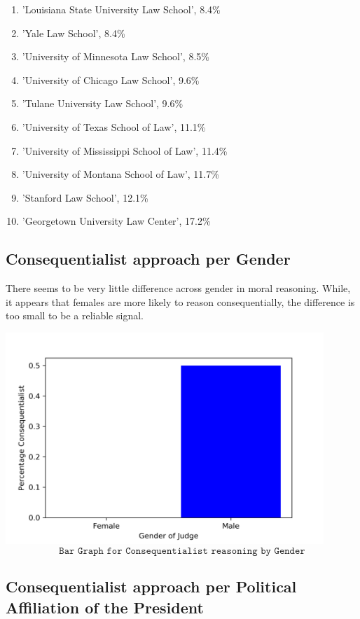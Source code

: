 \documentclass{article}
\begin{document}
\begin{enumerate}
    \item 'Louisiana State University Law School', 8.4\%
    \item 'Yale Law School', 8.4\%
    \item 'University of Minnesota Law School', 8.5\%
    \item 'University of Chicago Law School', 9.6\%
    \item 'Tulane University Law School', 9.6\%
    \item 'University of Texas School of Law', 11.1\%
    \item 'University of Mississippi School of Law', 11.4\%
    \item 'University of Montana School of Law', 11.7\%
    \item 'Stanford Law School', 12.1\%
    \item 'Georgetown University Law Center', 17.2\%
\end{enumerate}

\subsection{Consequentialist approach per Gender}

There seems to be very little difference across gender in moral reasoning. While, it appears that females are more likely to reason consequentially, the difference is too small to be a reliable signal.

\begin{center}
\includegraphics[width = 12cm, height = 8cm]{genderbar.png}
    \[\texttt{Bar Graph for Consequentialist reasoning by Gender}\]
\end{center}

\subsection{Consequentialist approach per Political Affiliation of the President}
\end{document}
